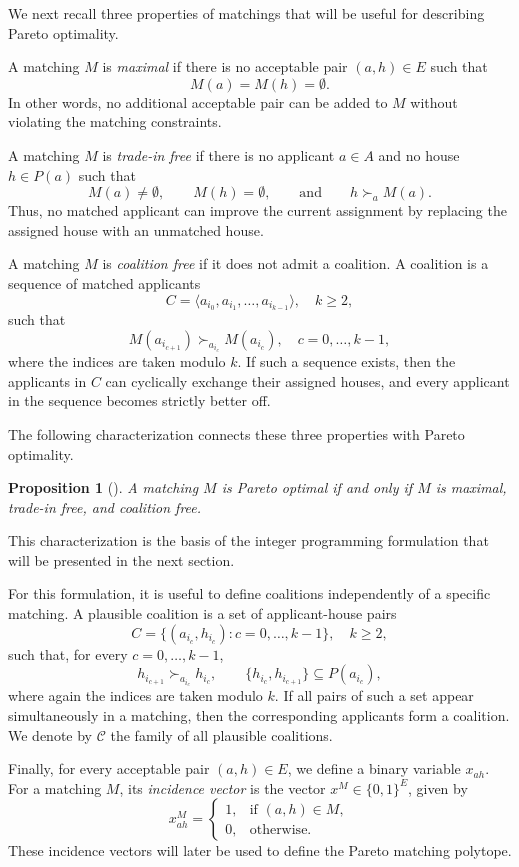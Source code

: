 \documentclass[12pt]{report}
\newtheorem{pprop}[base]{Proposition}
\numberwithin{algorithm}{chapter}
\begin{document}
	We next recall three properties of matchings that will be useful for describing
	Pareto optimality.
	
	A matching $M$ is \emph{maximal} if there is no acceptable pair $(a,h)\in E$ such
	that
	\[
	M(a)=M(h)=\emptyset.
	\]
	In other words, no additional acceptable pair can be added to \(M\) without
	violating the matching constraints.
	
	A matching $M$ is \emph{trade-in free} if there is no applicant $a\in A$ and no house
	$h\in P(a)$ such that
	\[
	M(a)\neq \emptyset,\qquad M(h)=\emptyset,
	\qquad\text{and}\qquad h \succ_{a} M(a).
	\]
	Thus, no matched applicant can improve the current assignment by replacing the
	assigned house with an unmatched house.
	
	A matching $M$ is \emph{coalition free} if it does not admit a coalition. A coalition is
	a sequence of matched applicants
	\[
	C=\langle a_{i_0},a_{i_1},\ldots,a_{i_{k-1}}\rangle,
	\quad k\geq 2,
	\]
	such that
	\[
	M(a_{i_{c+1}}) \succ_{a_{i_c}} M(a_{i_c}),
	\quad c=0,\ldots,k-1,
	\]
	where the indices are taken modulo $k$. If such a sequence exists, then the
	applicants in $C$ can cyclically exchange their assigned houses, and every applicant in
	the sequence becomes strictly better off.
	
	The following characterization connects these three properties with Pareto
	optimality.
	
	\begin{pprop}[{\cite[Chapter 2, p. 6]{abraham2004pareto}}]
		A matching $M$ is Pareto optimal if and only if $M$ is maximal, trade-in free,
		and coalition free.
	\end{pprop}
	
	This characterization is the basis of the integer programming formulation that
	will be presented in the next section.
	
	For this formulation, it is useful to define coalitions independently of a specific
	matching. A plausible coalition is a set of applicant-house pairs
	\[
	C=\{(a_{i_c},h_{i_c}): c=0,\ldots,k-1\},
	\quad k\geq 2,
	\]
	such that, for every \(c=0,\ldots,k-1\),
	\[
	h_{i_{c+1}} \succ_{a_{i_c}} h_{i_c},
	\qquad
	\{h_{i_c},h_{i_{c+1}}\}\subseteq P(a_{i_c}),
	\]
	where again the indices are taken modulo $k$. If all pairs of such a set appear
	simultaneously in a matching, then the corresponding applicants form a coalition.
	We denote by $\mathcal C$ the family of all plausible coalitions.
	
	Finally, for every acceptable pair $(a,h)\in E$, we define a binary variable
	$x_{ah}$. For a matching $M$, its \emph{incidence vector} is the vector $x^M\in
	\{0,1\}^{E}$,  given by
	\[
	x^M_{ah}=
	\begin{cases}
		1, & \text{if } (a,h)\in M,\\
		0, & \text{otherwise.}
	\end{cases}
	\]
	These incidence vectors will later be used to define the Pareto matching
	polytope.
\end{document}
